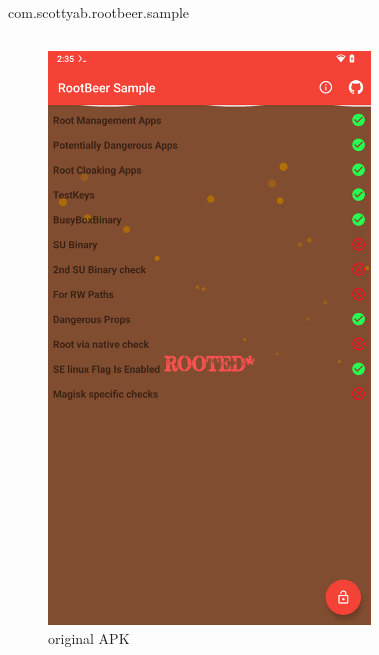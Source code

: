 \documentclass{beamer}
\begin{document}
\begin{frame}[fragile]{com.scottyab.rootbeer.sample}

    \begin{columns}
        \begin{figure}
            \centering
            \includegraphics[scale=0.07]{rootbeer.png}
            \caption{original APK}
        \end{figure}
        \begin{figure}

\end{figure}
\end{columns}
\end{frame}
\end{document}

